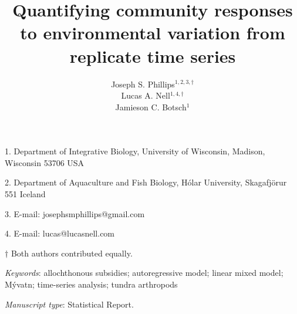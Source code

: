 \documentclass[12pt]{article}
\title{Quantifying community responses to environmental variation from replicate
time series}
\author{
Joseph S. Phillips$^{1,2,3,\dagger}$ \\
Lucas A. Nell$^{1,4,\dagger}$ \\
Jamieson C. Botsch$^{1}$}
\date{}
\begin{document}
\raggedright
\setlength\parindent{0.25in}

\maketitle


\noindent{} 1. Department of Integrative Biology, University of Wisconsin, Madison, Wisconsin 53706 USA

\noindent{} 2. Department of Aquaculture and Fish Biology, H\'{o}lar University, Skagafj\"{o}r{\dh}ur 551 Iceland

\noindent{} 3. E-mail: josephsmphillips@gmail.com

\noindent{} 4. E-mail: lucas@lucasnell.com

\noindent{} $\dagger$ Both authors contributed equally.



\bigskip


\bigskip


\textit{Keywords}: {allochthonous subsidies; autoregressive model; linear mixed model;
M\'{y}vatn; time-series analysis; tundra arthropods
}


\bigskip

\textit{Manuscript type}: Statistical Report.


\linenumbers{}

\newpage{}





\newpage{}



\end{document}
